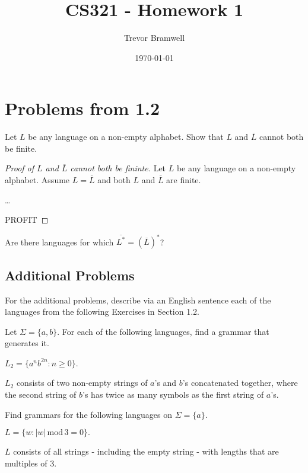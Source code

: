 \documentclass[12pt]{article}
\title{CS321 - Homework 1}
\author{Trevor Bramwell}
\date{\today}
\begin{document}
\maketitle

\section*{Problems from 1.2}
\begin{description}
    \item[6] Let $L$ be any language on a non-empty alphabet. Show that $L$ and
          $\overline{L}$ cannot both be finite.

    \item
        \begin{proof}[Proof of $L$ and $\overline{L}$ cannot both be fininte]
            Let $L$ be any language on a non-empty alphabet. Assume $L =
            \overline{L}$ and both $L$ and $\overline{L}$ are finite.

            \ldots

            PROFIT
        \end{proof}

    \item[7] Are there languages for which $\overline{L^*} = (\overline{L})^*$?
\end{description}

\subsection*{Additional Problems}
For the additional problems, describe via an English sentence each of
the languages from the following Exercises in Section 1.2.

\begin{description}
    \item[14(b)] Let $\Sigma = \{a,b\}$. For each of the following
                 languages, find a grammar that generates it.

                 $L_2 = \{a^n b^{2n} : n \ge 0\}$.

    \item $L_2$ consists of two non-empty strings of $a$'s and $b$'s
        concatenated together, where the second string of $b$'s has
        twice as many symbols as the first string of $a$'s.
\end{description}

\begin{description}
    \item[15(a)] Find grammars for the following languages on $\Sigma = \{a\}$.

                 $L = \{w : |w|\, \mathrm{mod}\, 3 = 0\}.$
    \item $L$ consists of all strings - including the empty string
        - with lengths that are multiples of 3.
\end{description}
\end{document}
